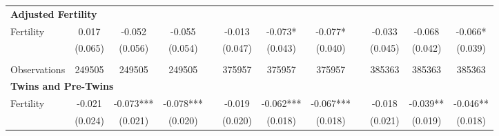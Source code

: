 \begin{landscape}
\begin{table}[htpb!]
\begin{center}
\begin{tabular}{lcccp{2mm}cccp{2mm}ccc}
\multicolumn{12}{l}{\textbf{Adjusted Fertility}}\\ 
Fertility&0.017&-0.052&-0.055&&-0.013&-0.073*&-0.077*&&-0.033&-0.068&-0.066*\\
&(0.065)&(0.056)&(0.054)&&(0.047)&(0.043)&(0.040)&&(0.045)&(0.042)&(0.039)\\
\begin{footnotesize}\end{footnotesize}&\begin{footnotesize}\end{footnotesize}&\begin{footnotesize}\end{footnotesize}&\begin{footnotesize}\end{footnotesize}&\begin{footnotesize}\end{footnotesize}&\begin{footnotesize}\end{footnotesize}&\begin{footnotesize}\end{footnotesize}&\begin{footnotesize}\end{footnotesize}&\begin{footnotesize}\end{footnotesize}&\begin{footnotesize}\end{footnotesize}\\Observations&249505&249505&249505&&375957&375957&375957&&385363&385363&385363\\
\multicolumn{12}{l}{\textbf{Twins and Pre-Twins}}\\ 
Fertility&-0.021&-0.073***&-0.078***&&-0.019&-0.062***&-0.067***&&-0.018&-0.039**&-0.046**\\
&(0.024)&(0.021)&(0.020)&&(0.020)&(0.018)&(0.018)&&(0.021)&(0.019)&(0.018)\\

\end{tabular}
\end{center}
\end{table}
\end{landscape}
